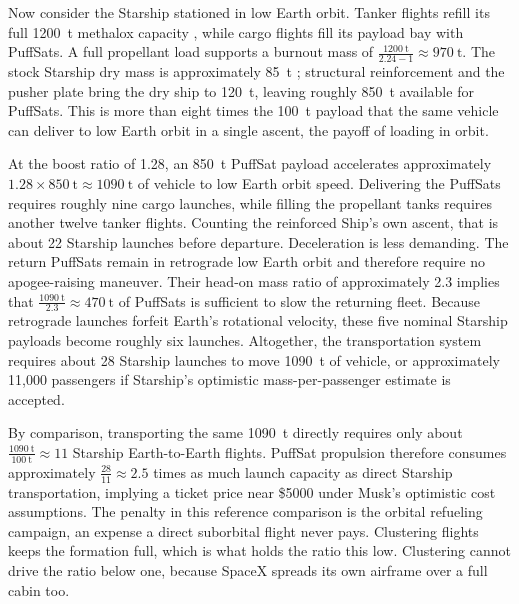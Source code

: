 \documentclass{article}
\begin{document}
Now consider the Starship stationed in low Earth orbit. Tanker flights refill its full \SI{1200}{\tonne} methalox capacity \cite{gunter_starship}, while cargo flights fill its payload bay with PuffSats. A full propellant load supports a burnout mass of $\frac{\SI{1200}{\tonne}}{2.24-1} \approx \SI{970}{\tonne}$. The stock Starship dry mass is approximately \SI{85}{\tonne} \cite{gunter_starship}; structural reinforcement and the pusher plate bring the dry ship to \SI{120}{\tonne}, leaving roughly \SI{850}{\tonne} available for PuffSats. This is more than eight times the \SI{100}{\tonne} payload that the same vehicle can deliver to low Earth orbit in a single ascent, the payoff of loading in orbit.

At the boost ratio of 1.28, an \SI{850}{\tonne} PuffSat payload accelerates approximately $1.28 \times \SI{850}{\tonne} \approx \SI{1090}{\tonne}$ of vehicle to low Earth orbit speed. Delivering the PuffSats requires roughly nine cargo launches, while filling the propellant tanks requires another twelve tanker flights. Counting the reinforced Ship's own ascent, that is about 22 Starship launches before departure. Deceleration is less demanding. The return PuffSats remain in retrograde low Earth orbit and therefore require no apogee-raising maneuver. Their head-on mass ratio of approximately 2.3 implies that $\frac{\SI{1090}{\tonne}}{2.3} \approx \SI{470}{\tonne}$ of PuffSats is sufficient to slow the returning fleet. Because retrograde launches forfeit Earth's rotational velocity, these five nominal Starship payloads become roughly six launches. Altogether, the transportation system requires about 28 Starship launches to move \SI{1090}{\tonne} of vehicle, or approximately 11{,}000 passengers if Starship's optimistic mass-per-passenger estimate is accepted.

By comparison, transporting the same \SI{1090}{\tonne} directly requires only about $\frac{\SI{1090}{\tonne}}{\SI{100}{\tonne}} \approx 11$ Starship Earth-to-Earth flights. PuffSat propulsion therefore consumes approximately $\frac{28}{11} \approx 2.5$ times as much launch capacity as direct Starship transportation, implying a ticket price near \$5000 under Musk's optimistic cost assumptions. The penalty in this reference comparison is the orbital refueling campaign, an expense a direct suborbital flight never pays. Clustering flights keeps the formation full, which is what holds the ratio this low. Clustering cannot drive the ratio below one, because SpaceX spreads its own airframe over a full cabin too.
\end{document}
